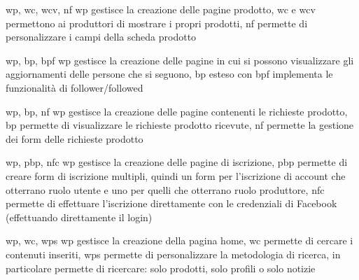 
{\acrlong{wp}, \acrlong{wc}, \acrlong{wcv}, \acrlong{nf}}
{\acrlong{wp} gestisce la creazione delle pagine prodotto, \acrlong{wc} e \acrlong{wcv} permettono ai produttori di mostrare i propri prodotti, \acrlong{nf} permette di personalizzare i campi della scheda prodotto}


{\acrlong{wp}, \acrlong{bp}, \acrlong{bpf}}
{\acrlong{wp} gestisce la creazione delle pagine in cui si possono visualizzare gli aggiornamenti delle persone che si seguono, \acrlong{bp} esteso con \acrlong{bpf} implementa le funzionalità di follower/followed}


{\acrlong{wp}, \acrlong{bp}, \acrlong{nf}}
{\acrlong{wp} gestisce la creazione delle pagine contenenti le richieste prodotto, \acrlong{bp} permette di visualizzare le richieste prodotto ricevute, \acrlong{nf} permette la gestione dei form delle richieste prodotto}


{\acrlong{wp}, \acrlong{pbp}, \acrlong{nfc}}
{\acrlong{wp} gestisce la creazione delle pagine di iscrizione, \acrlong{pbp} permette di creare form di iscrizione multipli, quindi un form per l'iscrizione di account che otterrano ruolo utente e uno per quelli che otterrano ruolo produttore, \acrlong{nfc} permette di effettuare l'iscrizione direttamente con le credenziali di Facebook (effettuando direttamente il login)}


{\acrlong{wp}, \acrlong{wc}, \acrlong{wps}}
{\acrlong{wp} gestisce la creazione della pagina home, \acrlong{wc} permette di cercare i contenuti inseriti, \acrlong{wps} permette di personalizzare la metodologia di ricerca, in particolare permette di ricercare: solo prodotti, solo profili o solo notizie}


{}
{}


{}
{}


{}
{}


